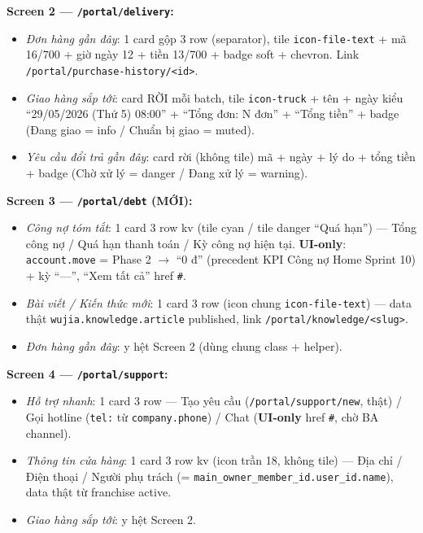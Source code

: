 \textbf{Screen 2 --- \texttt{/portal/delivery}:}
\begin{itemize}
  \item \emph{Đơn hàng gần đây}: 1 card gộp 3 row (separator), tile
        \texttt{icon-file-text} + mã 16/700 + giờ ngày 12 + tiền 13/700 + badge soft +
        chevron. Link \texttt{/portal/purchase-history/<id>}.
  \item \emph{Giao hàng sắp tới}: card RỜI mỗi batch, tile \texttt{icon-truck} + tên +
        ngày kiểu ``29/05/2026 (Thứ 5) \textbullet{} 08:00'' + ``Tổng đơn: N đơn'' +
        ``Tổng tiền'' + badge (Đang giao = info / Chuẩn bị giao = muted).
  \item \emph{Yêu cầu đổi trả gần đây}: card rời (không tile) mã + ngày + lý do +
        tổng tiền + badge (Chờ xử lý = danger / Đang xử lý = warning).
\end{itemize}

\textbf{Screen 3 --- \texttt{/portal/debt} (MỚI):}
\begin{itemize}
  \item \emph{Công nợ tóm tắt}: 1 card 3 row kv (tile cyan / tile danger ``Quá hạn'') ---
        Tổng công nợ / Quá hạn thanh toán / Kỳ công nợ hiện tại. \textbf{UI-only}:
        \texttt{account.move} = Phase 2 \(\rightarrow\) ``0 đ'' (precedent KPI Công nợ
        Home Sprint 10) + kỳ ``---'', ``Xem tất cả'' href \texttt{\#}.
  \item \emph{Bài viết / Kiến thức mới}: 1 card 3 row (icon chung \texttt{icon-file-text})
        --- data thật \texttt{wujia.knowledge.article} published, link
        \texttt{/portal/knowledge/<slug>}.
  \item \emph{Đơn hàng gần đây}: y hệt Screen 2 (dùng chung class + helper).
\end{itemize}

\textbf{Screen 4 --- \texttt{/portal/support}:}
\begin{itemize}
  \item \emph{Hỗ trợ nhanh}: 1 card 3 row --- Tạo yêu cầu (\texttt{/portal/support/new},
        thật) / Gọi hotline (\texttt{tel:} từ \texttt{company.phone}) / Chat
        (\textbf{UI-only} href \texttt{\#}, chờ BA channel).
  \item \emph{Thông tin cửa hàng}: 1 card 3 row kv (icon trần 18, không tile) --- Địa chỉ
        / Điện thoại / Người phụ trách (= \texttt{main\_owner\_member\_id.user\_id.name}),
        data thật từ franchise active.
  \item \emph{Giao hàng sắp tới}: y hệt Screen 2.
\end{itemize}

